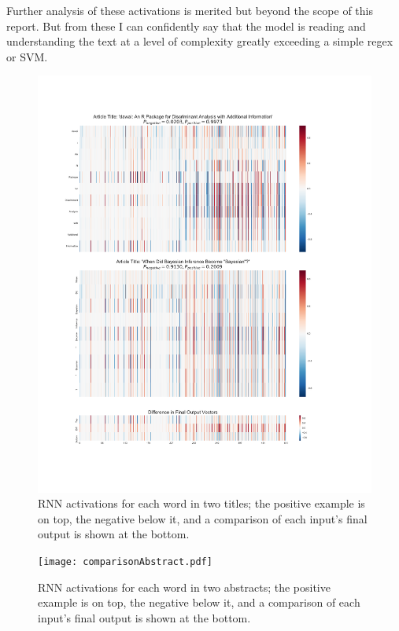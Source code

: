\documentclass[12pt, a4paper]{article}
\begin{document}
Further analysis of these activations is merited but beyond the scope of this report. But from these I can confidently say that the model is reading and understanding the text at a level of complexity greatly exceeding a simple regex or SVM.

\begin{figure}
	\centering
		\includegraphics[width=\textwidth]{comparisonTitle.pdf}
	\caption[RNN activations for titles]{RNN activations for each word in two titles; the positive example is on top, the negative below it, and a comparison of each input's final output is shown at the bottom.}\label{title}
\end{figure}

\begin{figure}
	\centering
		\texttt{[image: comparisonAbstract.pdf]}
	\caption[RNN activations for abstractss]{RNN activations for each word in two abstracts; the positive example is on top, the negative below it, and a comparison of each input's final output is shown at the bottom.}\label{abstract}
\end{figure}
\end{document}
